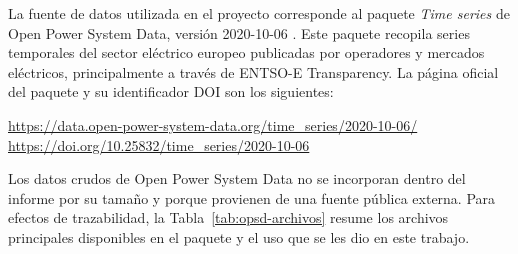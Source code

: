 La fuente de datos utilizada en el proyecto corresponde al paquete \emph{Time series} de Open Power System Data, versión 2020-10-06 \parencite{opsd2020timeseries}. Este paquete recopila series temporales del sector eléctrico europeo publicadas por operadores y mercados eléctricos, principalmente a través de ENTSO-E Transparency. La página oficial del paquete y su identificador DOI son los siguientes:

\begin{center}
    \url{https://data.open-power-system-data.org/time_series/2020-10-06/}\\
    \url{https://doi.org/10.25832/time_series/2020-10-06}
\end{center}

Los datos crudos de Open Power System Data no se incorporan dentro del informe por su tamaño y porque provienen de una fuente pública externa. Para efectos de trazabilidad, la Tabla~\ref{tab:opsd-archivos} resume los archivos principales disponibles en el paquete y el uso que se les dio en este trabajo.

